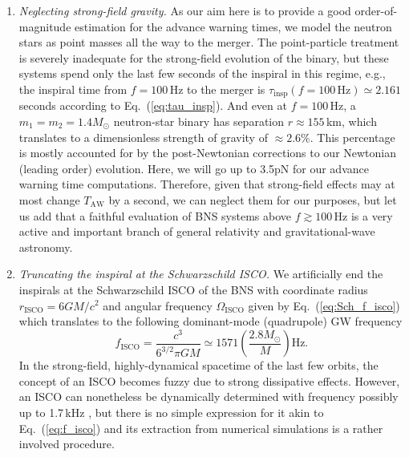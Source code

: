 \documentclass[prd,amsmath,amssymb,aps,floats,amsfonts,notitlepage,superscriptaddress,eqsecnum,nofootinbib,10pt]{revtex4-1}
\newcommand{\f}{\frac}
\newcommand{\be}{\begin{equation}}
\newcommand{\ee}{\end{equation}}
\begin{document}
\begin{enumerate}
 \item {\it Neglecting strong-field gravity.}
As our aim here is to provide a good order-of-magnitude estimation for the advance warning times, we model the neutron stars as point masses %
all the way to the merger. The point-particle treatment is severely inadequate for the strong-field evolution of the binary, but these systems spend only the last few seconds of the inspiral in this regime, e.g., the inspiral time from $f=100\,$Hz to the merger is
$\tau_\text{insp}(f=100\,\text{Hz})\simeq 2.161\,$seconds according to Eq.~(\ref{eq:tau_insp}).
And even at $f=100\,$Hz, a $m_1=m_2=1.4M_\odot$ neutron-star binary has separation $r\approx 155\,$km, which translates to a dimensionless strength of gravity of $\approx 2.6\%$.
This percentage is mostly accounted for by the post-Newtonian
corrections to our Newtonian (leading order) evolution. 
Here, we will go up to 3.5pN for our
advance warning time computations.
Therefore, given that strong-field effects may at most change
$T_\text{AW}$ by a second, we can neglect them for our purposes,
but let us add that a faithful evaluation of BNS systems above $f\gtrsim 100\,$Hz is a very active and important branch of general relativity and gravitational-wave astronomy. %
%
\item {\it Truncating the inspiral at the Schwarzschild ISCO.}
We artificially end the inspirals at the Schwarzschild ISCO of the BNS with coordinate radius $r_\text{ISCO} = 6GM/c^2$ and angular frequency $\Omega_\text{ISCO}$ %
given by Eq.~(\ref{eq:Sch_f_isco}) which translates to the following dominant-mode (quadrupole) GW frequency
\be
f_\text{ISCO} = \f{c^3}{6^{3/2}\pi G M} \simeq 1571 \left(\f{2.8M_\odot}{M}\right)\text{Hz} \label{eq:f_isco}.
\ee
In the strong-field, highly-dynamical spacetime of the last few orbits, the
concept of an ISCO becomes fuzzy due to strong dissipative effects. However, an ISCO can nonetheless be dynamically determined
with frequency possibly up to 1.7\,kHz \cite{Marronetti:2003hx}, 
but there is no simple expression for it akin to Eq.~(\ref{eq:f_isco}) and its extraction from numerical simulations is a rather involved procedure.

\end{enumerate}
\end{document}
